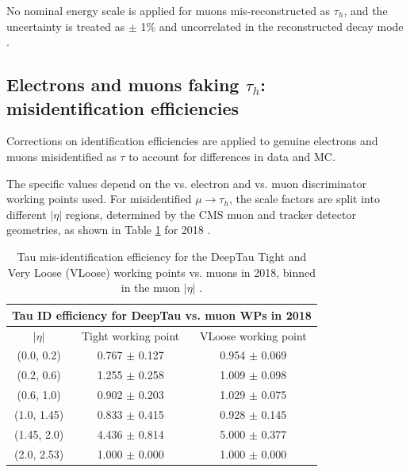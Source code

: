 No nominal energy scale is applied for muons mis-reconstructed as $\tau_{h}$, and the uncertainty is treated as $\pm$ 1\% and uncorrelated in the reconstructed decay mode \cite{twiki_HiggsToTauTauWorkingLegacyRun2}. 

\subsection{Electrons and muons faking \texorpdfstring{$\tau_{h}$}{tauh}: misidentification efficiencies}
Corrections on identification efficiencies are applied to genuine electrons and muons misidentified as $\tau$ to account for differences in data and MC.

The specific values depend on the vs. electron and vs. muon discriminator working points used. 
For misidentified $\mu \rightarrow \tau_{h}$, the scale factors are split into different $|\eta|$ regions, determined by the CMS muon and tracker detector geometries, as shown in Table \ref{table:tauIDeff_deepTau_vs_muon} for 2018 \cite{twiki_TAU_POG_tauidrecommendationforrun2}.


\begin{table}[h]
    \centering
    \begin{tabular}{|c|c|c|}
    \hline
    \multicolumn{3}{|c|}{Tau ID efficiency for DeepTau vs. muon WPs in 2018} \\ \hline
    \hline
    $|\eta|$  & Tight working point & VLoose working point \\ \hline
    (0.0, 0.2)     & 0.767 $\pm$ 0.127  & 0.954 $\pm$ 0.069  \\ \hline 
    (0.2, 0.6)     & 1.255 $\pm$ 0.258  & 1.009 $\pm$ 0.098  \\ \hline 
    (0.6, 1.0)     & 0.902 $\pm$ 0.203  & 1.029 $\pm$ 0.075 \\ \hline 
    (1.0, 1.45)    & 0.833 $\pm$ 0.415  & 0.928 $\pm$ 0.145\\ \hline
    (1.45, 2.0)    & 4.436 $\pm$ 0.814   & 5.000 $\pm$ 0.377 \\ \hline
    (2.0, 2.53)    & 1.000 $\pm$ 0.000         & 1.000 $\pm$ 0.000\\ \hline
    \end{tabular}
    \caption[Tau mis-identification efficiency for the DeepTau Tight and Very Loose (VLoose) working points vs. muons in 2018.]{Tau mis-identification efficiency for the DeepTau Tight and Very Loose (VLoose) working points vs. muons in 2018, binned in the muon $|\eta|$ \cite{twiki_TAU_POG_tauidrecommendationforrun2}.}
    \label{table:tauIDeff_deepTau_vs_muon}
\end{table}

